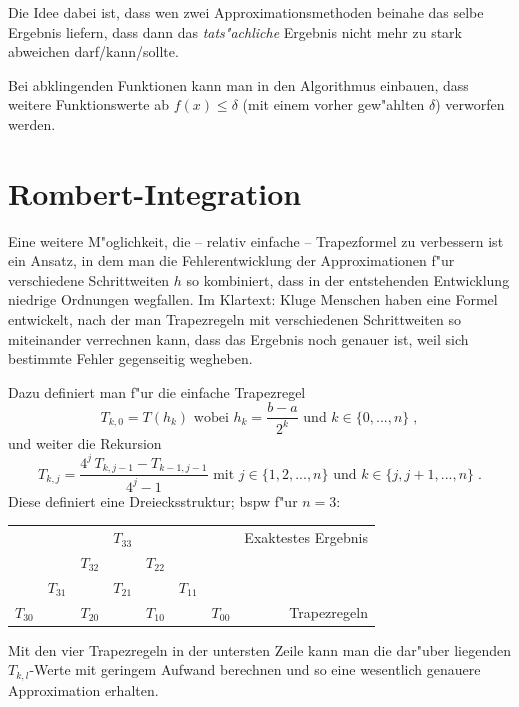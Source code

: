 \documentclass[a4paper]{book}
\begin{document}
Die Idee dabei ist, dass wen zwei Approximationsmethoden beinahe das
selbe Ergebnis liefern, dass dann das \emph{tats"achliche} Ergebnis
nicht mehr zu stark abweichen darf/kann/sollte.

Bei abklingenden Funktionen kann man in den Algorithmus einbauen, dass
weitere Funktionswerte ab $f(x) \leq \delta$ (mit einem vorher
gew"ahlten $\delta$) verworfen werden.







\section{Rombert-Integration}
\label{sec:rombert_integration}

Eine weitere M"oglichkeit, die -- relativ einfache -- Trapezformel zu
verbessern ist ein Ansatz, in dem man die Fehlerentwicklung der
Approximationen f"ur verschiedene Schrittweiten $h$ so kombiniert,
dass in der entstehenden Entwicklung niedrige Ordnungen wegfallen. Im
Klartext: Kluge Menschen haben eine Formel entwickelt, nach der man
Trapezregeln mit verschiedenen Schrittweiten so miteinander verrechnen
kann, dass das Ergebnis noch genauer ist, weil sich bestimmte Fehler
gegenseitig wegheben.

Dazu definiert man f"ur die einfache Trapezregel
\begin{equation}
  \label{eq:63}
  T_{k,0} = T(h_k) \text{ wobei } h_k = \frac{b-a}{2^k} \text{ und } k
  \in \{0, ..., n\} \;,
\end{equation}
und weiter die Rekursion
\begin{equation}
  \label{eq:64}
  T_{k,j} = \frac{4^j \, T_{k,j-1} - T_{k-1,j-1}}{4^j - 1} \text{ mit
  } j \in \{1,2,...,n\} \text{ und } k \in \{ j, j+1, ..., n
\} \;.
\end{equation}
Diese definiert eine Dreiecksstruktur; bspw f"ur $n=3$:

\begin{tabular}{c c c c c c c r}
  & & & $T_{33}$ & & & & Exaktestes Ergebnis\\
  & & $T_{32}$ & & $T_{22}$ \\
   & $T_{31}$ & & $T_{21}$ & & $T_{11}$ & \\
  $T_{30}$ &   & $T_{20}$  & & $T_{10}$ & & $T_{00}$ & Trapezregeln
\end{tabular}

Mit den vier Trapezregeln in der untersten Zeile kann man die dar"uber
liegenden $T_{k,l}$-Werte mit geringem Aufwand berechnen und so eine
wesentlich genauere Approximation erhalten.
\end{document}

